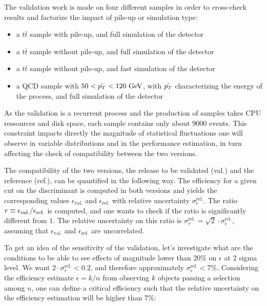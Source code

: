     The validation work is made on four different samples in order to cross-check results
    and factorize the impact of pile-up or simulation type:
    \begin{itemize}
        \item a $t\bar{t}$ sample with pile-up, and full simulation of the detector
        \item a $t\bar{t}$ sample without pile-up, and full simulation of the detector
        \item a $t\bar{t}$ sample without pile-up, and fast simulation of the detector
        \item a QCD sample with $50 < \hat{p_T} < 120~\text{GeV}$, with $\hat{p_T}$ characterizing
            the energy of the process, and full simulation of the detector
    \end{itemize}

    As the validation is a recurrent process and the production of samples takes CPU
    ressources and disk space, each sample contains only about 9000 events. This constraint
    impacts directly the magnitude of statistical fluctuations one will observe in
    variable distributions and in the performance estimation, in turn affecting the check of compatibility
    between the two versions.

    The compatibility of the two versions, the release to be validated (val.) and the
    reference (ref.), can be quantified in the following way. The efficiency for a given
    cut on the discriminant is computed in both versions and yields the corresponding
    values $\epsilon_\text{val.}$ and $\epsilon_\text{ref.}$ with relative uncertainty
    $\sigma^\text{rel.}_\epsilon$. The ratio $r \equiv \epsilon_\text{val.}/\epsilon_\text{ref.}$
    is computed, and one wants to check if the ratio is significantly different from 1.
    The relative uncertainty on this ratio is $\sigma^\text{rel.}_r = \sqrt{2} \cdot \sigma^\text{rel.}_\epsilon$,
    assuming that $\epsilon_\text{val.}$ and $\epsilon_\text{ref.}$ are uncorrelated.

    To get an idea of the sensitivity of the validation, let's investigate what are the
    conditions to be able to see effects of magnitude lower than 20\% on $\epsilon$ at 2
    sigma level. We want $2 \cdot \sigma^\text{rel.}_r < 0.2$, and therefore approximately
    $\sigma^\text{rel.}_\epsilon < 7\%$. Considering the efficiency estimate $\epsilon
    = k/n$ from observing $k$ objects passing a selection among $n$, one can define a
    critical efficiency such that the relative uncertainty on the efficiency estimation
    will be higher than 7\%:

